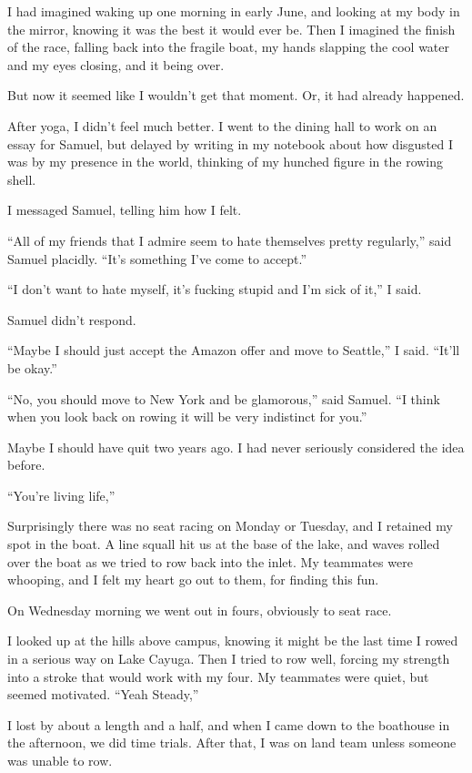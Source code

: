I had imagined waking up one morning in early June, and looking at my body in
the mirror, knowing it was the best it would ever be.  Then I imagined  the
finish of the race, falling back into the fragile boat, my hands slapping the
cool water and my eyes closing, and it being over.

But now it seemed like I wouldn't get that moment.  Or, it had already happened.

After yoga, I didn't feel much better.  I went to the dining hall to work on an
essay for Samuel, but delayed by writing in my notebook about how disgusted I
was by my presence in the world, thinking of my hunched figure in the rowing
shell.

I messaged Samuel, telling him how I felt.

``All of my friends that I admire seem to hate themselves pretty regularly,''
said Samuel placidly.  ``It's something I've come to accept.''

``I don't want to hate myself, it's fucking stupid and I'm sick of it,'' I said.  

Samuel didn't respond.

``Maybe I should just accept the Amazon offer and move to Seattle,'' I said.
``It'll be okay.''

``No, you should move to New York and be glamorous,'' said Samuel.  ``I think
when you look back on rowing it will be very indistinct for you.'' 

Maybe I should have quit two years ago.  I had never seriously considered the
idea before.

``You're living life,''

Surprisingly there was no seat racing on Monday or Tuesday, and I retained my
spot in the boat.  A line squall hit us at the base of the lake, and waves
rolled over the boat as we tried to row back into the inlet.  My teammates were
whooping, and I felt my heart go out to them, for finding this fun.

On Wednesday morning we went out in fours, obviously to seat race.

I looked up at the hills above campus, knowing it might be the last time I rowed
in a serious way on Lake Cayuga.  Then I tried to row well, forcing my strength
into a stroke that would work with my four.  My teammates were quiet, but seemed
motivated. ``Yeah Steady,'' 

I lost by about a length and a half, and when I came down to the boathouse in
the afternoon, we did time trials.  After that, I was on land team unless
someone was unable to row.

